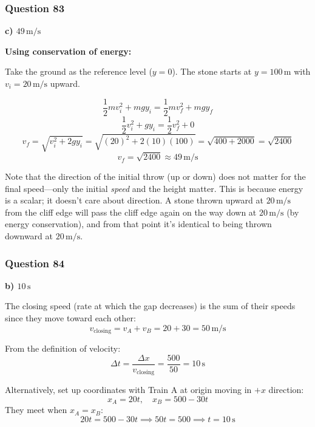 \documentclass[12pt,letterpaper]{article}
\begin{document}
\subsubsection*{Question 83}

\begin{answerbox}
\textbf{c) $49\,\text{m/s}$}
\end{answerbox}

\begin{explanationbox}
\textbf{Using conservation of energy:}

Take the ground as the reference level ($y = 0$). The stone starts at $y = 100\,\text{m}$ with $v_i = 20\,\text{m/s}$ upward.

\[
\frac{1}{2}mv_i^2 + mgy_i = \frac{1}{2}mv_f^2 + mgy_f
\]
\[
\frac{1}{2}v_i^2 + gy_i = \frac{1}{2}v_f^2 + 0
\]
\[
v_f = \sqrt{v_i^2 + 2gy_i} = \sqrt{(20)^2 + 2(10)(100)} = \sqrt{400 + 2000} = \sqrt{2400}
\]
\[
v_f = \sqrt{2400} \approx 49\,\text{m/s}
\]

Note that the direction of the initial throw (up or down) does not matter for the final speed---only the initial \emph{speed} and the height matter. This is because energy is a scalar; it doesn't care about direction. A stone thrown upward at $20\,\text{m/s}$ from the cliff edge will pass the cliff edge again on the way down at $20\,\text{m/s}$ (by energy conservation), and from that point it's identical to being thrown downward at $20\,\text{m/s}$.
\end{explanationbox}

\subsubsection*{Question 84}

\begin{answerbox}
\textbf{b) $10\,\text{s}$}
\end{answerbox}

\begin{explanationbox}
The closing speed (rate at which the gap decreases) is the sum of their speeds since they move toward each other:
\[
v_{\text{closing}} = v_A + v_B = 20 + 30 = 50\,\text{m/s}
\]

From the definition of velocity:
\[
\Delta t = \frac{\Delta x}{v_{\text{closing}}} = \frac{500}{50} = 10\,\text{s}
\]

Alternatively, set up coordinates with Train A at origin moving in $+x$ direction:
\[
x_A = 20t, \quad x_B = 500 - 30t
\]
They meet when $x_A = x_B$:
\[
20t = 500 - 30t \implies 50t = 500 \implies t = 10\,\text{s}
\]
\end{explanationbox}
\end{document}
